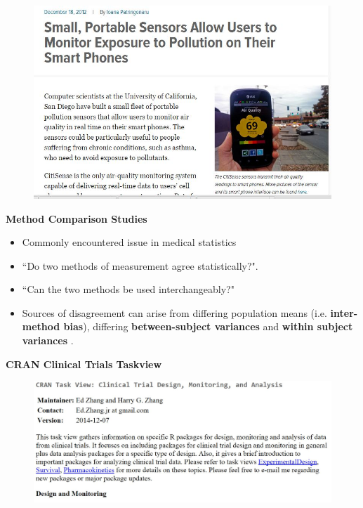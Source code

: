 \documentclass[compress]{beamer}        %
\makeatletter
\newcommand{\tcb}{\textcolor{beamer@blendedblue}}
\makeatother
\begin{document}
\begin{frame}
	\begin{figure}
		\centering
		\includegraphics[width=1.05\linewidth]{images/airqualitysensornewsarticle}
		
	\end{figure}
	
\end{frame}
		\begin{frame}{\bf \tcb{Method Comparison Studies}}
			\large
			\begin{itemize}\itemsep0.7cm
				\item Commonly encountered issue in medical statistics
				\item ``Do two methods of measurement agree statistically?".
				\item ``Can the two methods be used interchangeably?"
				\item Sources of disagreement can arise from differing population means (i.e. \textbf{inter-method bias}), differing \textbf{between-subject variances} and \textbf{within subject variances} \cite{Roy2009}.
			\end{itemize}
		\end{frame}
\begin{frame}
\textbf{CRAN Clinical Trials Taskview}	
	\begin{figure}
\centering
\includegraphics[width=1.1\linewidth]{images/CRAN-clinicaltrials}
\end{figure}

\end{frame}
\end{document}
